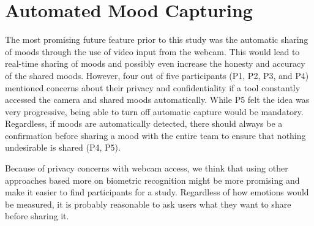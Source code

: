 \section{Automated Mood Capturing}
The most promising future feature prior to this study was the automatic sharing of moods through the use of video input from the webcam. This would lead to real-time sharing of moods and possibly even increase the honesty and accuracy of the shared moods. However, four out of five participants (P1, P2, P3, and P4) mentioned concerns about their privacy and confidentiality if a tool constantly accessed the camera and shared moods automatically. While P5 felt the idea was very progressive, being able to turn off automatic capture would be mandatory. Regardless, if moods are automatically detected, there should always be a confirmation before sharing a mood with the entire team to ensure that nothing undesirable is shared (P4, P5).

Because of privacy concerns with webcam access, we think that using other approaches based more on biometric recognition might be more promising and make it easier to find participants for a study. Regardless of how emotions would be measured, it is probably reasonable to ask users what they want to share before sharing it.